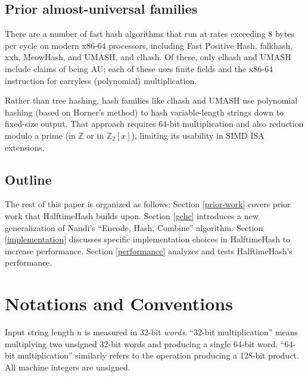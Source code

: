 \documentclass{llncs}
\newcommand{\ints}{\mathbb{Z}}
\begin{document}

\subsection{Prior almost-universal families}

There are a number of fast hash algorithms that run at rates exceeding 8 bytes per cycle on modern x86-64 processors, including Fast Positive Hash, falk\-hash, xxh, Meow\-Hash, and UMASH, and cl\-hash. \cite{smhasher}
Of these, only cl\-hash and U\-MASH include claims of being AU; each of these uses finite fields and the x86-64 instruction for carryless (polynomial) multiplication.

Rather than tree hashing, hash families like clhash and UMASH use polynomial hashing (based on Horner's method) to hash variable-length strings down to fixed-size output.
That approach requires 64-bit multiplication and also reduction modulo a prime (in $\ints$ or in $\ints_2[x]$), limiting its usability in SIMD ISA extensions.



\subsection{Outline}

The rest of this paper is organized as follows: Section \ref{prior-work} covers prior work that HalftimeHash builds upon.
Section \ref{gehc} introduces a new generalization of Nandi's ``Encode, Hash, Combine'' algorithm.\cite{ehc-nandi}
Section \ref{implementation} discusses specific implementation choices in HalftimeHash to increase performance.
Section \ref{performance} analyzes and tests HalftimeHash's performance.

\section{Notations and Conventions}

Input string length $n$ is measured in 32-bit {\em words}.
``32-bit multiplication'' means multiplying two unsigned 32-bit words and producing a single 64-bit word.
``64-bit multiplication'' similarly refers to the operation producing a 128-bit product.
All machine integers are unsigned.
\end{document}
